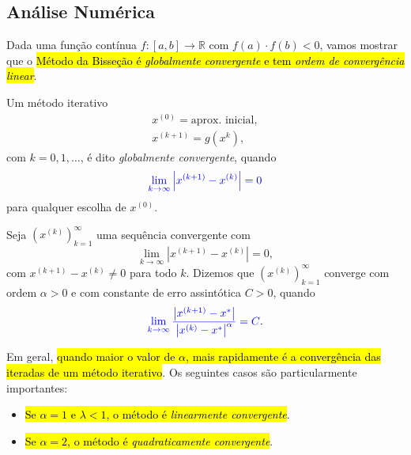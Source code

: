 \subsection{Análise Numérica}

Dada uma função contínua $f:[a, b]\to\mathbb{R}$ com $f(a)\cdot f(b) < 0$, vamos mostrar que o \hl{Método da Bisseção é \emph{globalmente convergente} e tem \emph{ordem de convergência linear}}.

\begin{defn}
  Um método iterativo
  \begin{gather}
    x^{(0)} = \text{aprox. inicial},\\
    x^{(k+1)} = g\left(x^{k}\right),
  \end{gather}
  com $k = 0,1,\ldots$, é dito \emph{globalmente convergente}, quando
  \begin{equation}
    {\color{blue}\lim_{k\to\infty}\left|x^{(k+1)}-x^{(k)}\right| = 0}
  \end{equation}
  para qualquer escolha de $x^{(0)}$.
\end{defn}

\begin{defn}
  Seja $\left(x^{(k)}\right)_{k=1}^\infty$ uma sequência convergente com
  \begin{equation}
    \lim_{k\to\infty} \left|x^{(k+1)}-x^{(k)}\right| = 0,
  \end{equation}
  com $x^{(k+1)}-x^{(k)}\neq 0$ para todo $k$. Dizemos que $\left(x^{(k)}\right)_{k=1}^\infty$ converge com ordem $\alpha>0$ e com constante de erro assintótica $C>0$, quando
  \begin{equation}
    {\color{blue}\lim_{k\to\infty}\frac{\left|x^{(k+1)}-x^*\right|}{\left|x^{(k)}-x^*\right|^\alpha} = C}. 
  \end{equation}
\end{defn}

Em geral, \hl{quando maior o valor de $\alpha$, mais rapidamente é a convergência das iteradas de um método iterativo}. Os seguintes casos são particularmente importantes:
\begin{itemize}
\item \hl{Se $\alpha = 1$ e $\lambda < 1$, o método é \emph{linearmente convergente}}.
\item \hl{Se $\alpha = 2$, o método é \emph{quadraticamente convergente}}.
\end{itemize}

